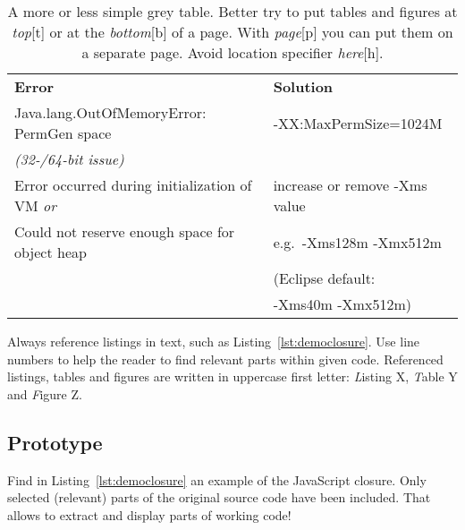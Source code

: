  \begin{center} 
  \begin{table}[tbp]
    \begin{tabular}{ l | l }
      \rowcolor{gray20}\textbf{Error}  
        & \textbf{Solution} \\
      \rowcolor{gray5}Java.lang.OutOfMemoryError: PermGen space
        & -XX:MaxPermSize=1024M \\
      \rowcolor{gray5}\textit{(32-/64-bit issue)}
        & \\
      \rowcolor{gray20}Error occurred during initialization of VM \textit{or}
        & increase or remove -Xms value \\
      \rowcolor{gray20}Could not reserve enough space for object heap
        & e.g.\ -Xms128m -Xmx512m \\
      \rowcolor{gray20}  	  	  
        & \small{(Eclipse default:}\\
      \rowcolor{gray20}  	  	  
        & \small{-Xms40m -Xmx512m)} \\
    \end{tabular}
    \caption[Simple Grey Table]
            {A more or less simple grey table. Better try to put tables and 
             figures at \textit{top}[t] or at the \textit{bottom}[b] of a 
             page. With \textit{page}[p] you can put them on a separate page. 
             Avoid location specifier \textit{here}[h].}
    \label{tab:grey}
  \end{table}
\end{center}


Always reference listings in text, such as Listing~\ref{lst:democlosure}. 
Use line numbers to help the reader to find relevant parts within given code.
Referenced listings, tables and figures are written in uppercase first
letter: \emph{L}isting X,  \emph{T}able Y and  \emph{F}igure Z.


\subsection{Prototype}

Find in Listing~\ref{lst:democlosure} an example of the JavaScript closure.
Only selected (relevant) parts of the original source code have been
included. That allows to extract and display parts of working code!





